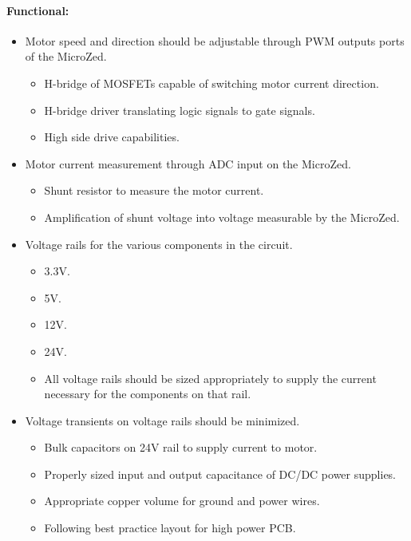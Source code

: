 \paragraph{Functional:}
\begin{itemize}
	\item Motor speed and direction should be adjustable through PWM outputs ports of the MicroZed.
	\begin{itemize}
		\item H-bridge of MOSFETs capable of switching motor current direction.
		\item H-bridge driver translating logic signals to gate signals.
		\item High side drive capabilities.
	\end{itemize}

	\item Motor current measurement through ADC input on the MicroZed.
	\begin{itemize}
		\item Shunt resistor to measure the motor current.
		\item Amplification of shunt voltage into voltage measurable by the MicroZed. 
	\end{itemize}

	\item Voltage rails for the various components in the circuit.
	\begin{itemize}
		\item 3.3V.
		\item 5V.
		\item 12V.
		\item 24V.
		\item All voltage rails should be sized appropriately to supply the current necessary for the components on that rail.
	\end{itemize}

	\item Voltage transients on voltage rails should be minimized.
	\begin{itemize}
		\item Bulk capacitors on 24V rail to supply current to motor.
		\item Properly sized input and output capacitance of DC/DC power supplies.
		\item Appropriate copper volume for ground and power wires.
		\item Following best practice layout for high power PCB. 
	\end{itemize}


\end{itemize}
